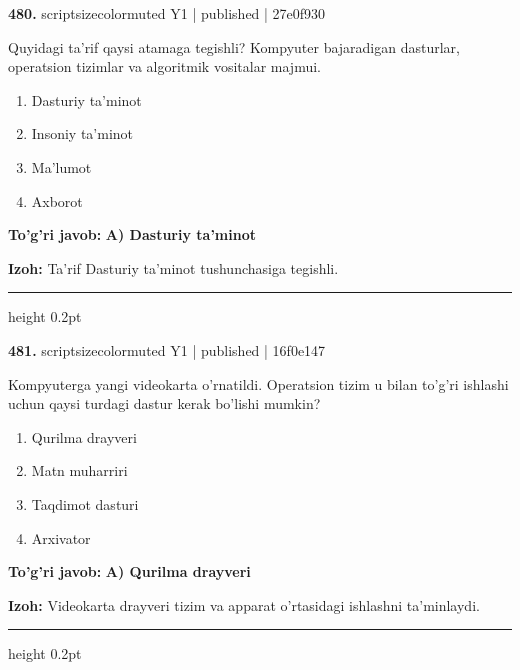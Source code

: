 \documentclass[10pt,a4paper]{article}
\begin{document}
{\bfseries\sffamily\color{ink} 480.} {scriptsizecolor{muted} Y1 | published | 27e0f930}
\par
Quyidagi ta'rif qaysi atamaga tegishli? Kompyuter bajaradigan dasturlar, operatsion tizimlar va algoritmik vositalar majmui.
\begin{enumerate}[label=\Alph*),leftmargin=9mm]
\item Dasturiy ta'minot
\item Insoniy ta'minot
\item Ma'lumot
\item Axborot
\end{enumerate}
\begin{tcolorbox}[enhanced,breakable,colback=teal!4,colframe=teal!60!black,boxrule=0.45pt,arc=1.2mm,left=2.7mm,right=2.7mm,top=1.8mm,bottom=1.8mm,before skip=2mm,after skip=2mm]
{\bfseries\sffamily\color{teal}To'g'ri javob:} \textbf{A) Dasturiy ta'minot}
\par\smallskip
{\bfseries Izoh:} Ta'rif Dasturiy ta'minot tushunchasiga tegishli.
\end{tcolorbox}
\vspace{2mm}\hrule height 0.2pt\vspace{3mm}

{\bfseries\sffamily\color{ink} 481.} {scriptsizecolor{muted} Y1 | published | 16f0e147}
\par
Kompyuterga yangi videokarta o'rnatildi. Operatsion tizim u bilan to'g'ri ishlashi uchun qaysi turdagi dastur kerak bo'lishi mumkin?
\begin{enumerate}[label=\Alph*),leftmargin=9mm]
\item Qurilma drayveri
\item Matn muharriri
\item Taqdimot dasturi
\item Arxivator
\end{enumerate}
\begin{tcolorbox}[enhanced,breakable,colback=teal!4,colframe=teal!60!black,boxrule=0.45pt,arc=1.2mm,left=2.7mm,right=2.7mm,top=1.8mm,bottom=1.8mm,before skip=2mm,after skip=2mm]
{\bfseries\sffamily\color{teal}To'g'ri javob:} \textbf{A) Qurilma drayveri}
\par\smallskip
{\bfseries Izoh:} Videokarta drayveri tizim va apparat o'rtasidagi ishlashni ta'minlaydi.
\end{tcolorbox}
\vspace{2mm}\hrule height 0.2pt\vspace{3mm}
\end{document}
